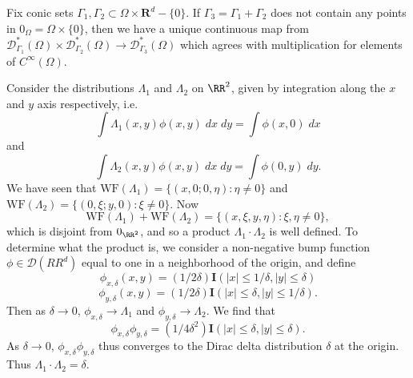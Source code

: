 \begin{theorem}
    Fix conic sets $\Gamma_1,\Gamma_2 \subset \Omega \times \mathbf{R}^d - \{ 0 \}$. If $\Gamma_3 = \Gamma_1 + \Gamma_2$ does not contain any points in $0_\Omega = \Omega \times \{ 0 \}$, then we have a unique continuous map from $\mathcal{D}^*_{\Gamma_1}(\Omega) \times \mathcal{D}^*_{\Gamma_2}(\Omega) \to \mathcal{D}^*_{\Gamma_3}(\Omega)$ which agrees with multiplication for elements of $C^\infty(\Omega)$.
\end{theorem}

\begin{example}
    Consider the distributions $\Lambda_1$ and $\Lambda_2$ on $\RR^2$, given by integration along the $x$ and $y$ axis respectively, i.e.
    \[ \int \Lambda_1(x,y) \phi(x,y)\; dx\; dy = \int \phi(x,0)\; dx \]
    and
    \[ \int \Lambda_2(x,y) \phi(x,y)\; dx\; dy = \int \phi(0,y)\; dy. \]
    We have seen that $\text{WF}(\Lambda_1) = \{ (x,0;0,\eta) : \eta \neq 0 \}$ and $\text{WF}(\Lambda_2) = \{ (0,\xi;y,0) : \xi \neq 0 \}$. Now
    \[ \text{WF}(\Lambda_1) + \text{WF}(\Lambda_2) = \{ (x,\xi,y,\eta): \xi, \eta \neq 0 \}, \]
    which is disjoint from $0_{\RR^2}$, and so a product $\Lambda_1 \cdot \Lambda_2$ is well defined. To determine what the product is, we consider a non-negative bump function $\phi \in \mathcal{D}(RR^d)$ equal to one in a neighborhood of the origin, and define
    \[ \phi_{x,\delta}(x,y) = (1/2\delta) \mathbf{I}(|x| \leq 1/\delta, |y| \leq \delta) \]
    \[ \phi_{y,\delta}(x,y) = (1/2\delta) \mathbf{I}(|x| \leq \delta, |y| \leq 1/\delta). \]
    Then as $\delta \to 0$, $\phi_{x,\delta} \to \Lambda_1$ and $\phi_{y,\delta} \to \Lambda_2$. We find that
    \[ \phi_{x,\delta} \phi_{y,\delta} = (1/4\delta^2) \mathbf{I}(|x| \leq \delta, |y| \leq \delta). \]
    As $\delta \to 0$, $\phi_{x,\delta} \phi_{y,\delta}$ thus converges to the Dirac delta distribution $\delta$ at the origin. Thus $\Lambda_1 \cdot \Lambda_2 = \delta$.
\end{example}

